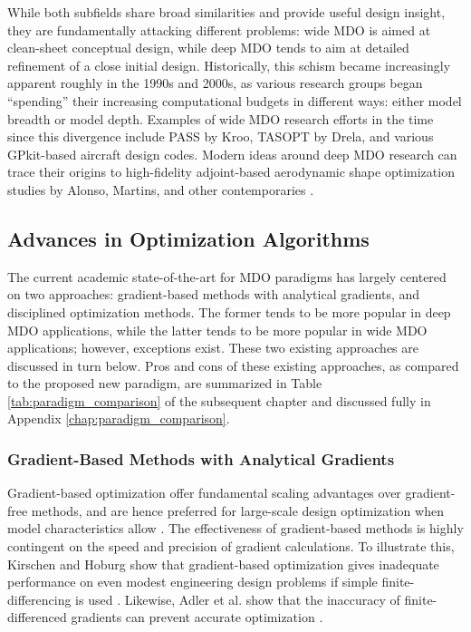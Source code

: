 \documentclass[12pt,vi,oneside,table]{report}
\begin{document}
    While both subfields share broad similarities and provide useful design insight, they are fundamentally attacking different problems: wide MDO is aimed at clean-sheet conceptual design, while deep MDO tends to aim at detailed refinement of a close initial design. Historically, this schism became increasingly apparent roughly in the 1990s and 2000s, as various research groups began ``spending'' their increasing computational budgets in different ways: either model breadth or model depth. Examples of wide MDO research efforts in the time since this divergence include PASS \cite{antoine_framework_2005} by Kroo, TASOPT \cite{drela_tasopt_2010} by Drela, and various GPkit-based \cite{hoburg_geometric_2014} aircraft design codes. Modern ideas around deep MDO research can trace their origins to high-fidelity adjoint-based aerodynamic shape optimization studies by Alonso, Martins, and other contemporaries \cite{alonso_pymdo_2004, martins_coupledadjoint_2005, choi_multifidelity_2008}.

    \subsection{Advances in Optimization Algorithms}

    The current academic state-of-the-art for MDO paradigms has largely centered on two approaches: gradient-based methods with analytical gradients, and disciplined optimization methods. The former tends to be more popular in deep MDO applications, while the latter tends to be more popular in wide MDO applications; however, exceptions exist. These two existing approaches are discussed in turn below. Pros and cons of these existing approaches, as compared to the proposed new paradigm, are summarized in Table \ref{tab:paradigm_comparison} of the subsequent chapter and discussed fully in Appendix \ref{chap:paradigm_comparison}.

    \subsubsection{Gradient-Based Methods with Analytical Gradients}

    Gradient-based optimization offer fundamental scaling advantages over gradient-free methods, and are hence preferred for large-scale design optimization when model characteristics allow \cite{lyu_benchmarking_2014, martins_engineering_2021}. The effectiveness of gradient-based methods is highly contingent on the speed and precision of gradient calculations. To illustrate this, Kirschen and Hoburg show that gradient-based optimization gives inadequate performance on even modest engineering design problems if simple finite-differencing is used \cite{kirschen}. Likewise, Adler et al. show that the inaccuracy of finite-differenced gradients can prevent accurate optimization \cite{adler_cfd_2022}.
\end{document}
